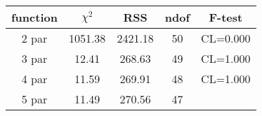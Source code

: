\begin{tabular}{c|c|c|c|c}
function & $\chi^2$ & RSS & ndof & F-test \\
\hline
2 par & 1051.38 & 2421.18 & 50 & CL=0.000 \\
3 par & 12.41 & 268.63 & 49 & CL=1.000 \\
4 par & 11.59 & 269.91 & 48 & CL=1.000 \\
5 par & 11.49 & 270.56 & 47 & \\
\hline
\end{tabular}